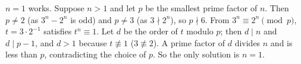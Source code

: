 $n=1$ works. Suppose $n>1$ and let $p$ be the smallest prime factor of $n$. Then $p\ne2$ (as $3^n-2^n$ is odd) and $p\ne3$ (as $3\nmid2^n$), so $p\nmid6$. From $3^n\equiv2^n\pmod p$, $t=3\cdot2^{-1}$ satisfies $t^n\equiv1$. Let $d$ be the order of $t$ modulo $p$; then $d\mid n$ and $d\mid p-1$, and $d>1$ because $t\not\equiv1$ ($3\not\equiv2$). A prime factor of $d$ divides $n$ and is less than $p$, contradicting the choice of $p$. So the only solution is $\boxed{n=1}$.
